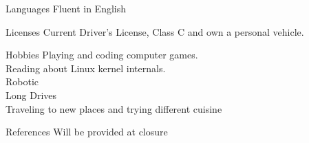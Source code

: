 \documentclass{resume}
\begin{document}
\begin{rSection}{Languages}
 Fluent in English
\end{rSection}

\begin{rSection}{Licenses}
Current Driver’s License, Class C and own a personal vehicle.
\end{rSection}


\begin{rSection}{Hobbies}
Playing and coding computer games.\\
Reading about Linux kernel internals.\\
Robotic\\
Long Drives\\
Traveling to new places and trying different cuisine\\
\end{rSection}


\begin{rSection}{References}
Will be provided at closure
\end{rSection}
\end{document}
